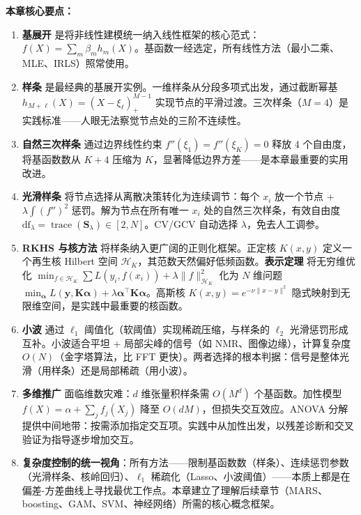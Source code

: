 \medskip
\textbf{本章核心要点：}

\begin{enumerate}[label=(\arabic*)]
    \item \textbf{基展开} 是将非线性建模统一纳入线性框架的核心范式：$f(X) = \sum_m \beta_m h_m(X)$。基函数一经选定，所有线性方法（最小二乘、MLE、IRLS）照常使用。
    
    \item \textbf{样条} 是最经典的基展开实例。一维样条从分段多项式出发，通过截断幂基 $h_{M+\ell}(X) = (X-\xi_\ell)_+^{M-1}$ 实现节点的平滑过渡。三次样条（$M=4$）是实践标准——人眼无法察觉节点处的三阶不连续性。
    
    \item \textbf{自然三次样条} 通过边界线性约束 $f''(\xi_1) = f''(\xi_K) = 0$ 释放 4 个自由度，将基函数数从 $K+4$ 压缩为 $K$，显著降低边界方差——是本章最重要的实用改进。
    
    \item \textbf{光滑样条} 将节点选择从离散决策转化为连续调节：每个 $x_i$ 放一个节点 + $\lambda \int (f'')^2$ 惩罚。解为节点在所有唯一 $x_i$ 处的自然三次样条，有效自由度 $\mathrm{df}_\lambda = \operatorname{trace}(\mathbf{S}_\lambda) \in [2, N]$。CV/GCV 自动选择 $\lambda$，免去人工调参。
    
    \item \textbf{RKHS 与核方法} 将样条纳入更广阔的正则化框架。正定核 $K(x,y)$ 定义一个再生核 Hilbert 空间 $\mathcal{H}_K$，其范数天然偏好低频函数。\textbf{表示定理} 将无穷维优化 $\min_{f\in\mathcal{H}_K} \sum L(y_i, f(x_i)) + \lambda \|f\|_{\mathcal{H}_K}^2$ 化为 $N$ 维问题 $\min_{\boldsymbol{\alpha}} L(\mathbf{y}, \mathbf{K}\boldsymbol{\alpha}) + \lambda \boldsymbol{\alpha}^\top\mathbf{K}\boldsymbol{\alpha}$。高斯核 $K(x,y) = e^{-\nu\|x-y\|^2}$ 隐式映射到无限维空间，是实践中最重要的核函数。
    
    \item \textbf{小波} 通过 $\ell_1$ 阈值化（软阈值）实现稀疏压缩，与样条的 $\ell_2$ 光滑惩罚形成互补。小波适合平坦 + 局部尖峰的信号（如 NMR、图像边缘），计算复杂度 $O(N)$（金字塔算法，比 FFT 更快）。两者选择的根本判据：信号是整体光滑（用样条）还是局部稀疏（用小波）。
    
    \item \textbf{多维推广} 面临维数灾难：$d$ 维张量积样条需 $O(M^d)$ 个基函数。加性模型 $f(X) = \alpha + \sum_j f_j(X_j)$ 降至 $O(dM)$，但损失交互效应。ANOVA 分解提供中间地带：按需添加指定交互项。实践中从加性出发，以残差诊断和交叉验证为指导逐步增加交互。
    
    \item \textbf{复杂度控制的统一视角}：所有方法——限制基函数数（样条）、连续惩罚参数（光滑样条、核岭回归）、$\ell_1$ 稀疏化（Lasso、小波阈值）——本质上都是在偏差-方差曲线上寻找最优工作点。本章建立了理解后续章节（MARS、boosting、GAM、SVM、神经网络）所需的核心概念框架。
\end{enumerate}
